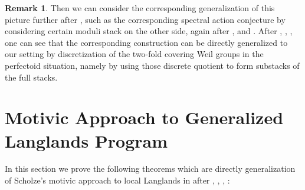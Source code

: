 \documentclass[12pt]{book}
\theoremstyle{definition}
\newtheorem{remark}{Remark}
\begin{document}
\begin{remark}
Then we can consider the corresponding generalization of this picture further after \cite{FS}, such as the corresponding spectral action conjecture by considering certain moduli stack on the other side, again after \cite{AI}, \cite{KI} and \cite{KXII}. After \cite{DHKM}, \cite{FS}, \cite{Z}, one can see that the corresponding construction can be directly generalized to our setting by discretization of the two-fold covering Weil groups in the perfectoid situation, namely by using those discrete quotient to form substacks of the full stacks.
\end{remark}



\newpage
\chapter{Motivic Approach to Generalized Langlands Program}

\noindent In this section we prove the following theorems which are directly generalization of Scholze's motivic approach to local Langlands in \cite{Scho1} after \cite{V1}, \cite{A1}, \cite{RS}, \cite{Scho2}:
\end{document}
